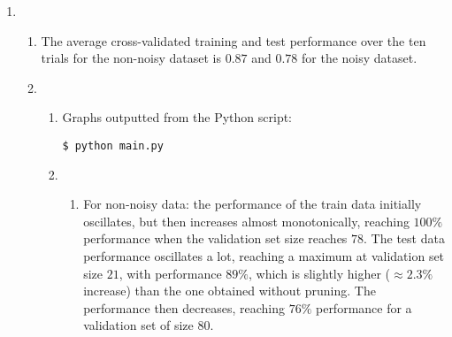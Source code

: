 \documentclass[11pt]{article}
\begin{document}
\begin {enumerate}
\begin {enumerate}
\begin{center}
\end{center}

\end{enumerate}

\item
\begin{enumerate}
\item
The average cross-validated training and test performance over the ten trials for the non-noisy dataset is $0.87$ and $0.78$ for the noisy dataset.

\item
\begin{enumerate}
\item
Graphs outputted from the Python script:

\begin{verbatim}
$ python main.py
\end{verbatim}



\item
\begin{enumerate}
\item
For non-noisy data: the performance of the train data initially oscillates, but then increases almost monotonically, reaching $100\%$ performance when the validation set size reaches $78$. The test data performance oscillates a lot, reaching a maximum at validation set size $21$, with performance $ 89\%$, which is slightly higher ($\approx2.3\%$ increase) than the one obtained without pruning. The performance then decreases, reaching $76\%$ performance for a validation set of size $80$.


\end{enumerate}
\end{enumerate}
\end{enumerate}
\end{enumerate}
\end{document}
